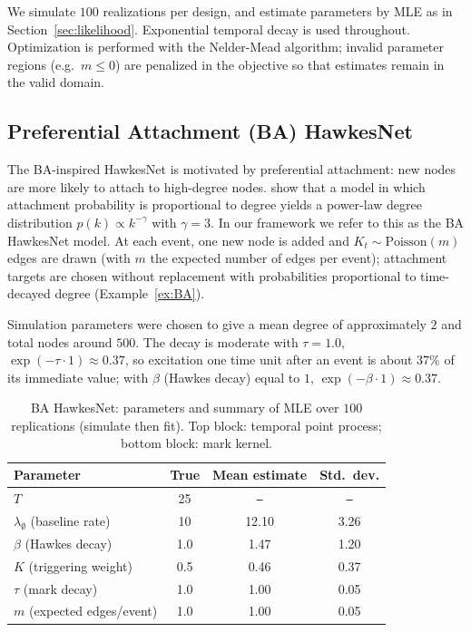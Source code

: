 \documentclass[12pt]{article}
\begin{document}
We simulate $100$ realizations per design, and estimate parameters by MLE as in Section~\ref{sec:likelihood}. Exponential temporal decay is used throughout. Optimization is performed with the Nelder-Mead algorithm; invalid parameter regions (e.g.\ $m \leq 0$) are penalized in the objective so that estimates remain in the valid domain.

\subsection{Preferential Attachment (BA) HawkesNet}\label{sec:BA_sim}

The BA-inspired HawkesNet is motivated by preferential attachment: new nodes are more likely to attach to high-degree nodes. \citet{BA_model} show that a model in which attachment probability is proportional to degree yields a power-law degree distribution $p(k) \propto k^{-\gamma}$ with $\gamma = 3$. In our framework we refer to this as the BA HawkesNet model. At each event, one new node is added and $K_t \sim \text{Poisson}(m)$ edges are drawn (with $m$ the expected number of edges per event); attachment targets are chosen without replacement with probabilities proportional to time-decayed degree (Example~\ref{ex:BA}).

Simulation parameters were chosen to give a mean degree of approximately $2$ and total nodes around $500$. The decay is moderate with $\tau = 1.0$, $\exp(-\tau \cdot 1) \approx 0.37$, so excitation one time unit after an event is about $37\%$ of its immediate value; with $\beta$ (Hawkes decay) equal to $1$, $\exp(-\beta \cdot 1) \approx 0.37$.

\begin{table}[!htb]
    \centering
    \begin{tabular}{lccc}
        \toprule
        Parameter & True & Mean estimate & Std.\ dev. \\
        \midrule
        $T$ & 25 & \texttt{--} & \texttt{--} \\
        \midrule
        $\lambda_{\emptyset}$ (baseline rate) & 10 & 12.10 & 3.26 \\
        $\beta$ (Hawkes decay) & 1.0 & 1.47 & 1.20 \\
        $K$ (triggering weight) & 0.5 & 0.46 & 0.37 \\
        \midrule
        $\tau$ (mark decay) & 1.0 & 1.00 & 0.05 \\
        $m$ (expected edges/event) & 1.0 & 1.00 & 0.05 \\
        \midrule
    \end{tabular}
    \caption{BA HawkesNet: parameters and summary of MLE over $100$ replications (simulate then fit). Top block: temporal point process; bottom block: mark kernel.}
    \label{tab:BA_table}
\end{table}
\end{document}
